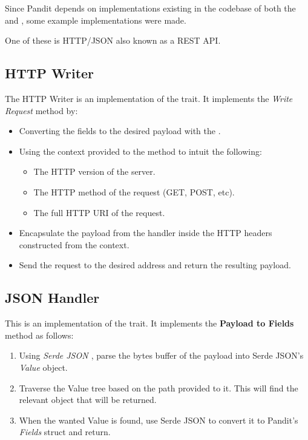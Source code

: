 \documentclass[a4paper,12pt]{report}
\begin{document}
Since Pandit depends on implementations existing in the codebase of both the  and , some example implementations were made.

One of these is HTTP/JSON also known as a REST API.

\subsection{HTTP Writer}

The HTTP Writer is an implementation of the  trait.
It implements the \textit{Write Request} method by:
\begin{itemize}
    \item Converting the fields to the desired payload with the .
    \item Using the context provided to the method to intuit the following:
    \begin{itemize}
        \item The HTTP version of the server.
        \item The HTTP method of the request (GET, POST, etc).
        \item The full HTTP URI of the request.
    \end{itemize}
    \item Encapsulate the payload from the handler inside the HTTP headers constructed from the context.
    \item Send the request to the desired address and return the resulting payload.
\end{itemize}

\subsection{JSON Handler}
This is an implementation of the  trait.
It implements the \textbf{Payload to Fields} method as follows:
\begin{enumerate}
    \item Using \textit{Serde JSON \cite{serde_json}}, parse the bytes buffer of the payload into Serde JSON's \textit{Value} object.
    \item Traverse the Value tree based on the path provided to it. This will find the relevant object that will be returned.
    \item When the wanted Value is found, use Serde JSON to convert it to Pandit's \textit{Fields} struct and return.
\end{enumerate}
\end{document}
